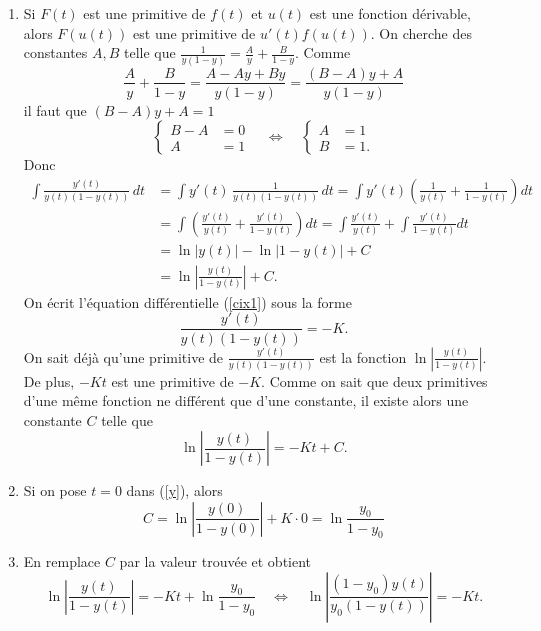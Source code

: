 \documentclass[11pt,class=report,crop=false]{standalone}
\begin{document}
\sauteligne
\begin{enumerate} 
	\item 
	Si $ F(t) $ est une primitive de $ f(t) $ et $ u(t) $ est une fonction 
	dérivable, alors $ F(u(t)) $ est une primitive de $ u'(t) f(u(t)) $. 
	On cherche des constantes $ A, B $ telle que 
	$ 
	\frac{1}{y(1-y)} = \frac{A}{y} + \frac{B}{1 - y} 
	$. Comme 
	\begin{equation*} 
		\frac{A}{y} + \frac{B}{1 - y} = \frac{A - Ay + By}{y(1-y)} 
		= \frac{(B - A)y + A}{y(1-y)} 
	\end{equation*} 
	il faut que $ (B - A)y + A = 1 $ 
	\begin{equation*} 
		\begin{cases} 
			B - A &= 0 \\ 
			A &= 1 
		\end{cases} 
		\quad \Longleftrightarrow \quad 
		\begin{cases} 
			A &= 1 \\ 
			B &= 1. 
		\end{cases} 
	\end{equation*} 
	Donc 
	\begin{equation*} 
		\begin{split} 
			\int \frac{y'(t)}{y(t)(1-y(t))} \, dt 
			&=  
			\int y'(t) \, \frac{1}{y(t)(1-y(t))} \, dt 
			= 
			\int y'(t) \left(\frac{1}{y(t)} + \frac{1}{1 - y(t)}\right) dt \\ 
			&= 
			\int \left(\frac{y'(t)}{y(t)} + \frac{y'(t)}{1 - y(t)}\right) dt 
			= 
			\int \frac{y'(t)}{y(t)} + \int \frac{y'(t)}{1 - y(t)} dt \\ 
			&=  
			\ln |y(t)| - \ln|1 - y(t)| + C \\ 
			&= 
			\ln \left|\frac{y(t)}{1 - y(t)}\right| + C. 
		\end{split} 
	\end{equation*} 
	On écrit l'équation différentielle (\ref{cix1}) sous la forme 
	\begin{equation*} 
		\frac{y'(t)}{y(t)(1-y(t))} = -K. 
	\end{equation*} 
	On sait déj\`a qu'une primitive de $ \frac{y'(t)}{y(t)(1-y(t))} $ 
	est la fonction $ \ln \left|\frac{y(t)}{1 - y(t)}\right| $. De plus, 
	$ -Kt $ est une primitive de $ -K $. Comme on sait que deux primitives 
	d'une même fonction ne différent que d'une constante, il existe 
	alors une constante $ C $ telle que 
	\begin{equation} \label{y} 
	\ln \left|\frac{y(t)}{1 - y(t)}\right| = -Kt + C. 
	\end{equation} 
	\item 
	Si on pose $ t = 0 $ dans (\ref{y}), alors 
	\begin{equation*} 
		C = \ln \left|\frac{y(0)}{1 - y(0)}\right| + K \cdot 0 
		= \ln \frac{y_0}{1 - y_0}
	\end{equation*} 
	\item 
	En remplace $ C $ par la valeur trouvée et obtient 
	\begin{equation*} 
		\ln \left|\frac{y(t)}{1 - y(t)}\right| = -Kt + \ln \frac{y_0}{1 - y_0} 
		\quad 
		\Longleftrightarrow 
		\quad 
		\ln \left|\frac{(1 - y_0)y(t) }{y_0(1 - y(t))}\right| = -Kt. 
	\end{equation*} 
\end{enumerate} 
\end{document}
